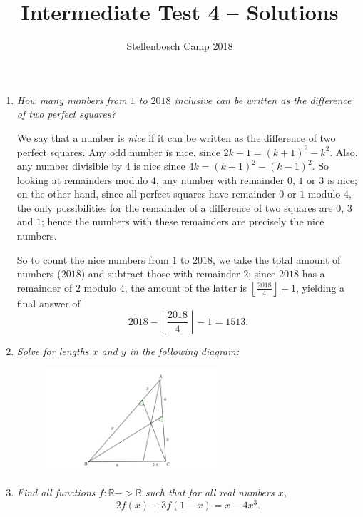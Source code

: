 \documentclass{article}
\title{Intermediate Test 4 -- Solutions}
\author{Stellenbosch Camp 2018}
\date{\vspace{-12pt}}
\newcommand{\floor}[1]{\ensuremath{\left\lfloor#1\right\rfloor}}
\begin{document}
\maketitle

\begin{enumerate}[1.]

\item %
\textit{How many numbers from $1$ to $2018$ inclusive can be written as the difference of two perfect squares?}

We say that a number is \emph{nice} if it can be written as the difference of two perfect squares. Any odd number is nice, since $2k+1 = (k+1)^2 -k^2$. Also, any number divisible by $4$ is nice since $4k = (k+1)^2 -(k-1)^2$. So looking at remainders modulo $4$, any number with remainder $0$, $1$ or $3$ is nice; on the other hand, since all perfect squares have remainder $0$ or $1$ modulo 4, the only possibilities for the remainder of a difference of two squares are $0$, $3$ and $1$; hence the numbers with these remainders are precisely the nice numbers.

So to count the nice numbers from $1$ to $2018$, we take the total amount of numbers ($2018$) and subtract those with remainder $2$; since $2018$ has a remainder of $2$ modulo $4$, the amount of the latter is $\floor{\frac{2018}{4}} +1$, yielding a final answer of \[ 2018 - \floor{\frac{2018}{4}} -1 = 1513. \]


\vspace{12pt}
\item %
\textit{Solve for lengths $x$ and $y$ in the following diagram:}

\begin{figure}[h]
\centering
\includegraphics[width=0.6\textwidth]{GeogebraTest4.png}
\end{figure}


\vspace{6pt}
\item %
\textit{Find all functions $f : \mathbb{R} -> \mathbb{R}$ such that for all real numbers $x$, \[ 2 f(x) +3 f(1-x) = x-4x^3. \]}


\end{enumerate}
\end{document}
